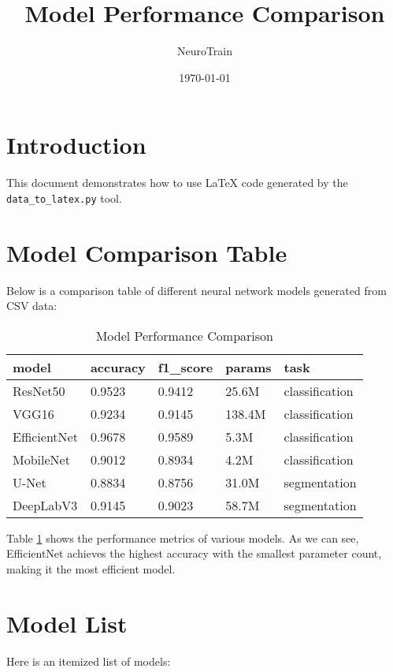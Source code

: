 \documentclass{article}
\title{Model Performance Comparison}
\author{NeuroTrain}
\date{\today}
\begin{document}
\maketitle

\section{Introduction}
This document demonstrates how to use LaTeX code generated by the \texttt{data\_to\_latex.py} tool.

\section{Model Comparison Table}

Below is a comparison table of different neural network models generated from CSV data:


\begin{table}[htbp]
\centering
\caption{Model Performance Comparison}
\label{tab:models}
\begin{tabular}{lllll}
\hline
model & accuracy & f1\_score & params & task \\
\hline
ResNet50 & 0.9523 & 0.9412 & 25.6M & classification \\
VGG16 & 0.9234 & 0.9145 & 138.4M & classification \\
EfficientNet & 0.9678 & 0.9589 & 5.3M & classification \\
MobileNet & 0.9012 & 0.8934 & 4.2M & classification \\
U-Net & 0.8834 & 0.8756 & 31.0M & segmentation \\
DeepLabV3 & 0.9145 & 0.9023 & 58.7M & segmentation \\
\hline
\end{tabular}
\end{table}

Table \ref{tab:models} shows the performance metrics of various models. 
As we can see, EfficientNet achieves the highest accuracy with the smallest 
parameter count, making it the most efficient model.

\section{Model List}

Here is an itemized list of models:
\end{document}
